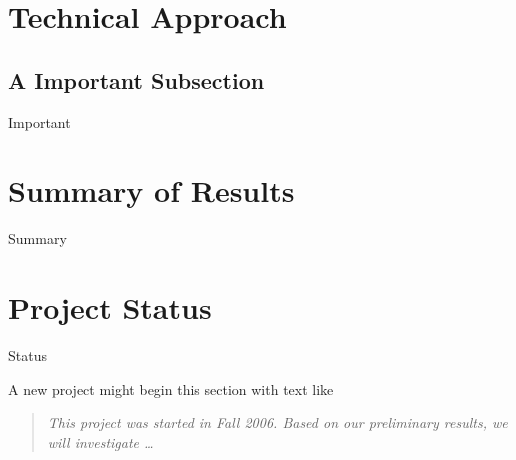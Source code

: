 \documentclass[conference, 11pt]{IEEEtran}
\begin{document}
\section{Technical Approach}

\subsection{A Important Subsection}
Important
\section{Summary of Results}
Summary
\section{Project Status}
Status

A new project might begin this section with  text like
\begin{quotation}
\em This project was started in Fall 2006. Based on our preliminary
results, we will investigate \ldots
\end{quotation} 


%
\end{document}
